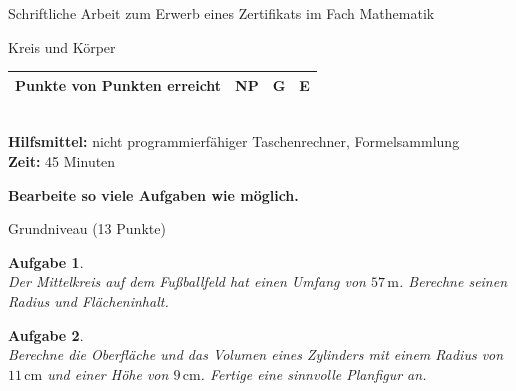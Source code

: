 \documentclass[11pt,fleqn]{article}
\theoremstyle{aufg}
\newtheorem{aufgabe}{Aufgabe}
\theoremstyle{bsp}
\begin{document}
 
    \begin{flushleft}
\begin{center}{Schriftliche Arbeit zum Erwerb eines Zertifikats im Fach Mathematik}\end{center} 
\begin{center}{\Large Kreis und K\"orper}\end{center} 
\renewcommand{\arraystretch}{2.15} 
\begin{tabular}{|p{10cm}|p{2cm}|p{2cm}|p{2cm}|} 
\hline 
\hspace{2cm} Punkte von \qquad35\qquad Punkten erreicht & \hspace{1.2cm} NP & G & E \\ 
\hline 
\end{tabular} \\[1em]    
{\bf Hilfsmittel: }nicht programmierf\"ahiger Taschenrechner, Formelsammlung\\ 
{\bf Zeit: }45 Minuten\\ 
\begin{center} {\bf Bearbeite so viele Aufgaben wie m\"oglich.} \end{center}\begin{center} \begin{framed} Grundniveau (13 Punkte) \end{framed} \end{center}\begin{aufgabe} ~ \\ 
Der Mittelkreis auf dem Fu\ss{}ballfeld hat einen Umfang von $57\mathrm{\,m}$. Berechne seinen Radius und Fl\"acheninhalt.
\end{aufgabe} 
\begin{aufgabe} ~ \\ 
Berechne die Oberfl\"ache und das Volumen eines Zylinders mit einem Radius von $11\mathrm{\,cm}$ und einer H\"ohe von $9\mathrm{\,cm}$. Fertige eine sinnvolle Planfigur an.
\end{aufgabe} 



\end{flushleft}
\end{document}
